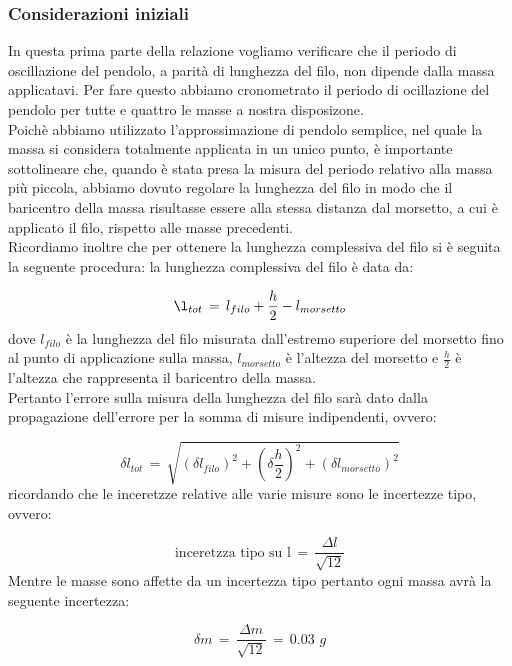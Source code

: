 \subsubsection{Considerazioni iniziali}
In questa prima parte della relazione vogliamo verificare che il periodo di oscillazione del pendolo, a parità di lunghezza del filo, non dipende dalla massa applicatavi.
Per fare questo abbiamo cronometrato il periodo di ocillazione del pendolo per tutte e quattro le masse a nostra disposizone.\\
Poichè abbiamo utilizzato l'approssimazione di pendolo semplice, nel quale la massa si considera totalmente applicata in un unico punto, è importante sottolineare che, quando è stata presa la misura del periodo relativo alla massa più piccola, abbiamo dovuto regolare la lunghezza del filo in modo che il baricentro della massa risultasse essere alla stessa distanza dal morsetto, a cui è applicato il filo, rispetto alle masse precedenti.\\
Ricordiamo inoltre che per ottenere la lunghezza complessiva del filo si è seguita la seguente procedura: la lunghezza complessiva del filo è data da:

\begin{equation}
	\l_{tot} \,=\, l_{filo} + \frac{h}{2} - l_{morsetto}
\end{equation}
%
dove $l _{filo}$ è la lunghezza del filo misurata dall'estremo superiore del morsetto fino al punto di applicazione sulla massa, $l_{morsetto}$ è l'altezza del morsetto e $\frac{h}{2}$ è l'altezza che rappresenta il baricentro della massa.\\
Pertanto l'errore sulla misura della lunghezza del filo sarà dato dalla propagazione dell'errore per la somma di misure indipendenti, ovvero:

\begin{equation*}
	\delta l_{tot} \,=\, \sqrt{(\delta l_{filo})^2 + (\delta \frac{h}{2})^2 + (\delta l_{morsetto})^2}
\end{equation*}
%
ricordando che le inceretzze relative alle varie misure sono le incertezze tipo, ovvero:

\begin{equation*}
	\text{inceretzza tipo su l} \,=\, \frac{\Delta l}{\sqrt{12}}
\end{equation*}
%
Mentre le masse sono affette da un incertezza tipo pertanto ogni massa avrà la seguente incertezza:

\begin{equation*}
	\delta m \,=\, \frac{\Delta m}{\sqrt{12}} \,=\, 0.03 \,\, g
\end{equation*}

